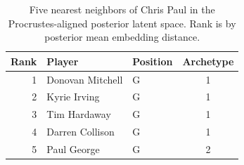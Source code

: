 \begin{table}[htbp]
  \centering\small
  \begin{tabular}{rllc}
    \toprule
    Rank & Player & Position & Archetype \\
    \midrule
    1 & Donovan Mitchell & G & 1 \\
    2 & Kyrie Irving & G & 1 \\
    3 & Tim Hardaway & G & 1 \\
    4 & Darren Collison & G & 1 \\
    5 & Paul George & G & 2 \\
    \bottomrule
  \end{tabular}
  \caption{Five nearest neighbors of Chris Paul in the Procrustes-aligned posterior latent space. Rank is by posterior mean embedding distance.}
  \label{tab:Chris_Paul_neighbors}
\end{table}

